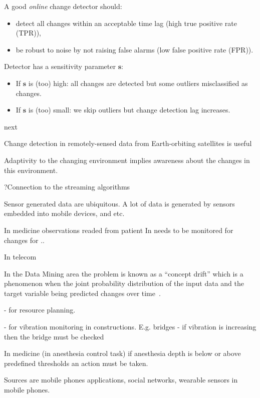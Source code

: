 A good \textit{online} change detector should:
\begin{itemize}
        \item detect all changes within an acceptable time lag (high true positive rate (TPR)),
        \item be robust to noise by not raising false alarms (low false positive rate (FPR)).
\end{itemize}

\def \sensp {\pmb{s}}
Detector has a sensitivity parameter $\sensp$:
\begin{itemize}
    \item If $\sensp$ is (too) high: all changes are detected but some outliers misclassified as changes.
    \item If $\sensp$ is (too) small: we skip outliers but  change detection lag increases.
\end{itemize}        
next
%    

Change detection in remotely-sensed data from Earth-orbiting satellites
is useful 

Adaptivity to the changing environment implies awareness about the changes in this environment.

?Connection to the streaming algorithms~\cite{}

Sensor generated data are ubiquitous.
A lot of data is generated by sensors embedded into mobile devices, and etc.

In medicine observations readed from patient  In needs to be monitored for changes for ..

In telecom

In the Data Mining area the problem is known as a ``concept drift'' which is a phenomenon when the joint probability distribution of the input data and the target variable being predicted changes over time~\cite{gama2014survey}.

- for resource planning.

- for vibration monitoring in constructions.
E.g. bridges - if vibration is increasing then the bridge must be checked 

In medicine (in anesthesia control task) if anesthesia depth is below or above predefined thresholds an action must be taken.

Sources are mobile phones applications, social networks, wearable sensors in mobile phones.

